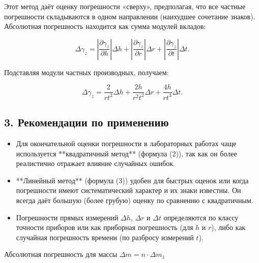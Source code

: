 \documentclass[a4paper,12pt]{article}
\begin{document}
Этот метод даёт оценку погрешности «сверху», предполагая, что все частные погрешности складываются в одном направлении (наихудшее сочетание знаков). Абсолютная погрешность находится как сумма модулей вкладов:

\[
\Delta \gamma_z = \left| \frac{\partial \gamma_z}{\partial h} \right| \Delta h + \left| \frac{\partial \gamma_z}{\partial r} \right| \Delta r + \left| \frac{\partial \gamma_z}{\partial t} \right| \Delta t.
\]

Подставляя модули частных производных, получаем:

\[
\boxed{\Delta \gamma_z = \frac{2}{r t^2} \Delta h + \frac{2h}{r^2 t^2} \Delta r + \frac{4h}{r t^3} \Delta t}. \tag{3}
\]

\subsection*{3. Рекомендации по применению}

\begin{itemize}
    \item Для окончательной оценки погрешности в лабораторных работах чаще используется **квадратичный метод** (формула (2)), так как он более реалистично отражает влияние случайных ошибок.
    \item **Линейный метод** (формула (3)) удобен для быстрых оценок или когда погрешности имеют систематический характер и их знаки известны. Он всегда даёт большую (более грубую) оценку по сравнению с квадратичным.
    \item Погрешности прямых измерений \(\Delta h\), \(\Delta r\) и \(\Delta t\) определяются по классу точности приборов или как приборная погрешность (для \(h\) и \(r\)), либо как случайная погрешность времени (по разбросу измерений \(t\)).
\end{itemize}
Абсолютная погрешность для массы $\Delta m = n \cdot \Delta m_1 $
\end{document}
